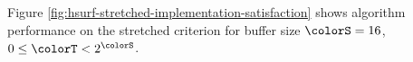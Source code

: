 Figure \ref{fig:hsurf-stretched-implementation-satisfaction} shows algorithm performance on the stretched criterion for buffer size $\colorS=16$, $0 \leq \colorT < 2^{\colorS}$.




